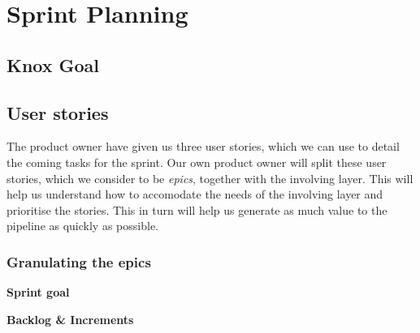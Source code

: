 \section{Sprint Planning}
\subsection{Knox Goal}
\subsection{User stories}
The \knox{} product owner have given us three user stories, which we can use to detail the coming tasks for the sprint.
Our own product owner will split these user stories, which we consider to be \textit{epics}, together with the involving layer. 
This will help us understand how to accomodate the needs of the involving layer and prioritise the stories. 
This in turn will help us generate as much value to the pipeline as quickly as possible.


\subsubsection*{Granulating the epics}


\textbf{Sprint goal}


\textbf{Backlog \& Increments}


